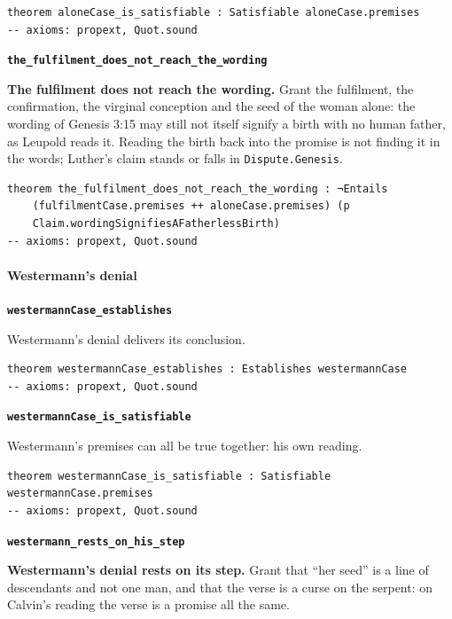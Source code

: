 \documentclass[11pt]{article}
\begin{document}
{\small\begin{verbatim}
theorem aloneCase_is_satisfiable : Satisfiable aloneCase.premises
-- axioms: propext, Quot.sound
\end{verbatim}}
\par\medskip\noindent\textbf{\texttt{the\_\allowbreak{}fulfilment\_\allowbreak{}does\_\allowbreak{}not\_\allowbreak{}reach\_\allowbreak{}the\_\allowbreak{}wording}}\par\nobreak\noindent
\textbf{The fulfilment does not reach the wording.} Grant the fulfilment, the confirmation, the virginal conception and the seed of the woman alone: the wording of Genesis 3:15 may still not itself signify a birth with no human father, as Leupold reads it. Reading the birth back into the promise is not finding it in the words; Luther’s claim stands or falls in \texttt{Dispute.Genesis}.

{\small\begin{verbatim}
theorem the_fulfilment_does_not_reach_the_wording : ¬Entails
    (fulfilmentCase.premises ++ aloneCase.premises) (p
    Claim.wordingSignifiesAFatherlessBirth)
-- axioms: propext, Quot.sound
\end{verbatim}}
\paragraph*{Westermann’s denial}
\leavevmode\par\nobreak
\par\medskip\noindent\textbf{\texttt{westermann\allowbreak{}Case\_\allowbreak{}establishes}}\par\nobreak\noindent
Westermann’s denial delivers its conclusion.

{\small\begin{verbatim}
theorem westermannCase_establishes : Establishes westermannCase
-- axioms: propext, Quot.sound
\end{verbatim}}
\par\medskip\noindent\textbf{\texttt{westermann\allowbreak{}Case\_\allowbreak{}is\_\allowbreak{}satisfiable}}\par\nobreak\noindent
Westermann’s premises can all be true together: his own reading.

{\small\begin{verbatim}
theorem westermannCase_is_satisfiable : Satisfiable westermannCase.premises
-- axioms: propext, Quot.sound
\end{verbatim}}
\par\medskip\noindent\textbf{\texttt{westermann\_\allowbreak{}rests\_\allowbreak{}on\_\allowbreak{}his\_\allowbreak{}step}}\par\nobreak\noindent
\textbf{Westermann’s denial rests on its step.} Grant that “her seed” is a line of descendants and not one man, and that the verse is a curse on the serpent: on Calvin’s reading the verse is a promise all the same.
\end{document}
